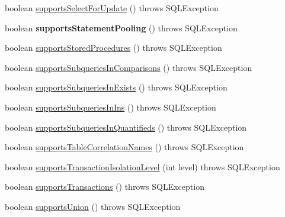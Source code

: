 \begin{DoxyCompactItemize}
boolean \mbox{\hyperlink{classcom_1_1mysql_1_1cj_1_1jdbc_1_1_database_meta_data_a035e7a96ff9eb26c5dc3fbfb33518311}{supports\+Select\+For\+Update}} ()  throws S\+Q\+L\+Exception 
\item 
\mbox{\label{classcom_1_1mysql_1_1cj_1_1jdbc_1_1_database_meta_data_aea1eb480f4ce27d09bc77003a697b48a}} 
boolean {\bfseries supports\+Statement\+Pooling} ()  throws S\+Q\+L\+Exception 
\item 
boolean \mbox{\hyperlink{classcom_1_1mysql_1_1cj_1_1jdbc_1_1_database_meta_data_ac02a41ca47262081bc15ef3374bf9efd}{supports\+Stored\+Procedures}} ()  throws S\+Q\+L\+Exception 
\item 
boolean \mbox{\hyperlink{classcom_1_1mysql_1_1cj_1_1jdbc_1_1_database_meta_data_aac9a3076e88d2e778883e93cc5c0cdb4}{supports\+Subqueries\+In\+Comparisons}} ()  throws S\+Q\+L\+Exception 
\item 
boolean \mbox{\hyperlink{classcom_1_1mysql_1_1cj_1_1jdbc_1_1_database_meta_data_aa6d5bdc1a6a78b6493817ca74db15cdd}{supports\+Subqueries\+In\+Exists}} ()  throws S\+Q\+L\+Exception 
\item 
boolean \mbox{\hyperlink{classcom_1_1mysql_1_1cj_1_1jdbc_1_1_database_meta_data_a27640ea9fba92317515c539f362a1bde}{supports\+Subqueries\+In\+Ins}} ()  throws S\+Q\+L\+Exception 
\item 
boolean \mbox{\hyperlink{classcom_1_1mysql_1_1cj_1_1jdbc_1_1_database_meta_data_a81fa0113f5f002abf3861aae97e2db8f}{supports\+Subqueries\+In\+Quantifieds}} ()  throws S\+Q\+L\+Exception 
\item 
boolean \mbox{\hyperlink{classcom_1_1mysql_1_1cj_1_1jdbc_1_1_database_meta_data_a6e316ad846d1057f54fac916bcaea66f}{supports\+Table\+Correlation\+Names}} ()  throws S\+Q\+L\+Exception 
\item 
boolean \mbox{\hyperlink{classcom_1_1mysql_1_1cj_1_1jdbc_1_1_database_meta_data_a240c8ebe82bfbacc94bcddf34729820e}{supports\+Transaction\+Isolation\+Level}} (int level)  throws S\+Q\+L\+Exception 
\item 
boolean \mbox{\hyperlink{classcom_1_1mysql_1_1cj_1_1jdbc_1_1_database_meta_data_aab0d5f01f66685c7da3527767754ff4c}{supports\+Transactions}} ()  throws S\+Q\+L\+Exception 
\item 
boolean \mbox{\hyperlink{classcom_1_1mysql_1_1cj_1_1jdbc_1_1_database_meta_data_a218eedd538cef52ef140cad36c418093}{supports\+Union}} ()  throws S\+Q\+L\+Exception 
\item 

\end{DoxyCompactItemize}
